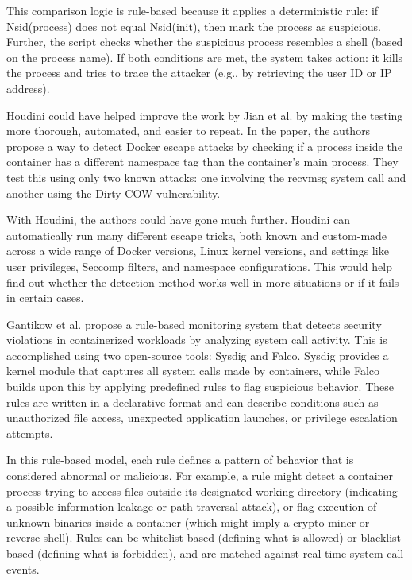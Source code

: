 \begin{doublespace}
This comparison logic is rule-based because it applies a deterministic rule: if Nsid(process) does not equal Nsid(init), then mark the process as suspicious. Further, the script checks whether the suspicious process resembles a shell (based on the process name). If both conditions are met, the system takes action: it kills the process and tries to trace the attacker (e.g., by retrieving the user ID or IP address).

Houdini could have helped improve the work by Jian et al. \cite{jian2017defense} by making the testing more thorough, automated, and easier to repeat. In the paper, the authors propose a way to detect Docker escape attacks by checking if a process inside the container has a different namespace tag than the container’s main process. They test this using only two known attacks: one involving the recvmsg system call and another using the Dirty COW vulnerability.

With Houdini, the authors could have gone much further. Houdini can automatically run many different escape tricks, both known and custom-made across a wide range of Docker versions, Linux kernel versions, and settings like user privileges, Seccomp filters, and namespace configurations. This would help find out whether the detection method works well in more situations or if it fails in certain cases.

Gantikow et al. \cite{gantikow2019rule} propose a rule-based monitoring system that detects security violations in containerized workloads by analyzing system call activity. This is accomplished using two open-source tools: Sysdig and Falco. Sysdig provides a kernel module that captures all system calls made by containers, while Falco builds upon this by applying predefined rules to flag suspicious behavior. These rules are written in a declarative format and can describe conditions such as unauthorized file access, unexpected application launches, or privilege escalation attempts.

In this rule-based model, each rule defines a pattern of behavior that is considered abnormal or malicious. For example, a rule might detect a container process trying to access files outside its designated working directory (indicating a possible information leakage or path traversal attack), or flag execution of unknown binaries inside a container (which might imply a crypto-miner or reverse shell). Rules can be whitelist-based (defining what is allowed) or blacklist-based (defining what is forbidden), and are matched against real-time system call events.


\end{doublespace}
